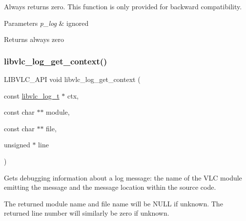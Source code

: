 Always returns zero. This function is only provided for backward compatibility.


\begin{DoxyParams}{Parameters}
{\em p\+\_\+log} & ignored \\
\hline
\end{DoxyParams}
\begin{DoxyReturn}{Returns}
always zero 
\end{DoxyReturn}
\mbox{\label{group__libvlc__log_ga9a01433d5badf4a4e8ba3fe1604da242}} 
\subsubsection{\texorpdfstring{libvlc\+\_\+log\+\_\+get\+\_\+context()}{libvlc\_log\_get\_context()}}
{\footnotesize\ttfamily L\+I\+B\+V\+L\+C\+\_\+\+A\+PI void libvlc\+\_\+log\+\_\+get\+\_\+context (\begin{DoxyParamCaption}\item[{const \hyperlink{structvlc__log__t}{libvlc\+\_\+log\+\_\+t} $\ast$}]{ctx,  }\item[{const char $\ast$$\ast$}]{module,  }\item[{const char $\ast$$\ast$}]{file,  }\item[{unsigned $\ast$}]{line }\end{DoxyParamCaption})}

Gets debugging information about a log message\+: the name of the V\+LC module emitting the message and the message location within the source code.

The returned module name and file name will be N\+U\+LL if unknown. The returned line number will similarly be zero if unknown.


